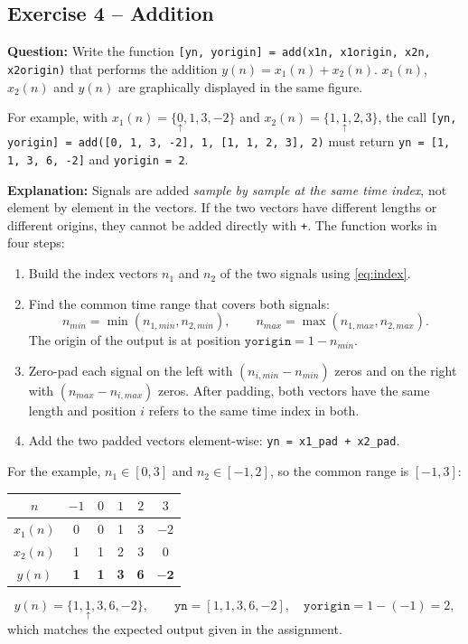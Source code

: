 \documentclass[12pt,a4paper]{article}
\newcommand{\org}[1]{\underset{\uparrow}{#1}}
\begin{document}
\subsection{Exercise 4 -- Addition}\label{sec:ex4}
\textbf{Question:} Write the function \texttt{[yn, yorigin] = add(x1n, x1origin, x2n, x2origin)} that performs the addition $y(n) = x_1(n) + x_2(n)$. $x_1(n)$, $x_2(n)$ and $y(n)$ are graphically displayed in the same figure.

For example, with $x_1(n) = \{\org{0}, 1, 3, -2\}$ and $x_2(n) = \{1, \org{1}, 2, 3\}$, the call \texttt{[yn, yorigin] = add([0, 1, 3, -2], 1, [1, 1, 2, 3], 2)} must return \texttt{yn = [1, 1, 3, 6, -2]} and \texttt{yorigin = 2}.

\textbf{Explanation:}
Signals are added \emph{sample by sample at the same time index}, not element by element in the vectors. If the two vectors have different lengths or different origins, they cannot be added directly with \texttt{+}. The function works in four steps:
\begin{enumerate}
    \item Build the index vectors $n_1$ and $n_2$ of the two signals using \eqref{eq:index}.
    \item Find the common time range that covers both signals:
    \begin{equation}
        n_{min} = \min(n_{1,min}, n_{2,min}), \qquad n_{max} = \max(n_{1,max}, n_{2,max}).
    \end{equation}
    The origin of the output is at position $\texttt{yorigin} = 1 - n_{min}$.
    \item Zero-pad each signal on the left with $(n_{i,min} - n_{min})$ zeros and on the right with $(n_{max} - n_{i,max})$ zeros. After padding, both vectors have the same length and position $i$ refers to the same time index in both.
    \item Add the two padded vectors element-wise: \texttt{yn = x1\_pad + x2\_pad}.
\end{enumerate}
For the example, $n_1 \in [0, 3]$ and $n_2 \in [-1, 2]$, so the common range is $[-1, 3]$:
\begin{center}
\begin{tabular}{|c|c|c|c|c|c|}
    \hline
    \rowcolor{headergray} $n$ & $-1$ & $0$ & $1$ & $2$ & $3$ \\ \hline
    $x_1(n)$ & 0 & 0 & 1 & 3 & $-2$ \\ \hline
    $x_2(n)$ & 1 & 1 & 2 & 3 & 0 \\ \hline
    $y(n)$   & \textbf{1} & \textbf{1} & \textbf{3} & \textbf{6} & $\mathbf{-2}$ \\ \hline
\end{tabular}
\end{center}
\begin{equation}
    y(n) = \{1, \org{1}, 3, 6, -2\}, \qquad \texttt{yn} = [1, 1, 3, 6, -2], \quad \texttt{yorigin} = 1 - (-1) = 2,
\end{equation}
which matches the expected output given in the assignment.
\end{document}
